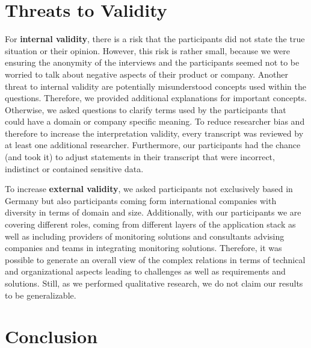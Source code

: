 \documentclass[runningheads]{llncs}
\begin{document}
\section{Threats to Validity}
\label{Threats to Validity}
For \textbf{internal validity}, there is a risk that the participants did not state the true situation or their opinion. However, this risk is rather small, because we were ensuring the anonymity of the interviews and the participants seemed not to be worried to talk about negative aspects of their product or company.
Another threat to internal validity are potentially misunderstood concepts used within the questions. Therefore, we provided additional explanations for important concepts. Otherwise, we asked questions to clarify terms used by the participants that could have a domain or company specific meaning. To reduce researcher bias and therefore to increase the interpretation validity, every transcript was reviewed by at least one additional researcher. Furthermore, our participants had the chance (and took it) to adjust statements in their transcript that were incorrect, indistinct or contained sensitive data.

To increase \textbf{external validity}, we asked participants not exclusively based in Germany but also participants coming form international companies with diversity in terms of domain and size. Additionally, with our participants we are covering different roles, coming from different layers of the application stack as well as including providers of monitoring solutions and consultants advising companies and teams in integrating monitoring solutions. Therefore, it was possible to generate an overall view of the complex relations in terms of technical and organizational aspects leading to challenges as well as requirements and solutions. Still, as we performed qualitative research, we do not claim our results to be generalizable. 

\section{Conclusion}
\label{Conclusion}
\end{document}
